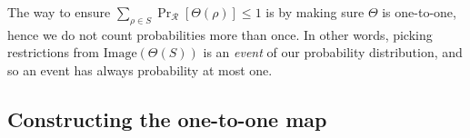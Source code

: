 
The way to ensure
$\sum_{\rho \in S} \Pr_{\mathcal{R}}[\Theta(\rho)] \leq 1
$
is by making sure \( \Theta \) is one-to-one, 
hence we do not count probabilities more than once.
In other words, picking restrictions from \(\text{Image}(\Theta(S))\) is an \emph{event} of our probability distribution, and so an event has always probability at most one.

\subsection{Constructing the one-to-one map}


